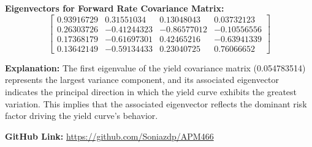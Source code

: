 \documentclass{article}
\begin{document}
\begin{enumerate}
        \textbf{Eigenvectors for Forward Rate Covariance Matrix:}
        \[
        \begin{bmatrix}
        0.93916729 & 0.31551034 & 0.13048043 & 0.03732123 \\
        0.26303726 & -0.41244323 & -0.86577012 & -0.10556556 \\
        0.17368179 & -0.61697301 & 0.42465216 & -0.63941339 \\
        0.13642149 & -0.59134433 & 0.23040725 & 0.76066652
        \end{bmatrix}
        \]
        
        \textbf{Explanation:} The first eigenvalue of the yield covariance matrix (0.054783514) represents the largest variance component, and its associated eigenvector indicates the principal direction in which the yield curve exhibits the greatest variation. This implies that the associated eigenvector reflects the dominant risk factor driving the yield curve's behavior.

        
    \end{enumerate}

\newpage


\noindent\textbf{GitHub Link:} \url{https://github.com/Soniazdp/APM466}
\end{document}
